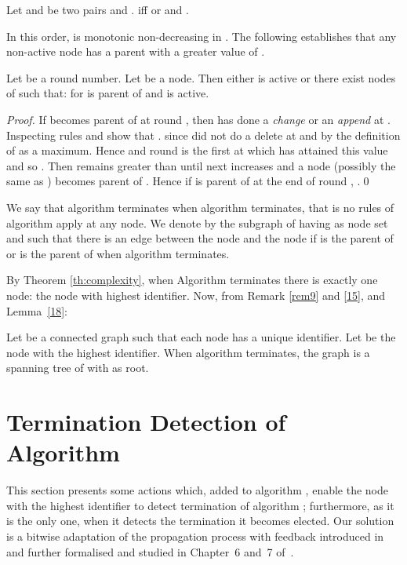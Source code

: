 \documentclass[11pt,envcountsame,letterpaper]{llncs}
\begin{document}
\begin{definition}
Let  and  be two pairs  and .
 iff  or  and .
\end{definition}
In this order,  is monotonic non-decreasing in .
The following establishes that any non-active node has a parent with a greater value of . 
\begin{lemma}\label{18}
Let  be a round number. Let 
 be a node. Then either  is active or there exist 
  nodes of 
such that: for   is parent of  and  
is active.
\end{lemma}
\begin{proof}
  If  becomes parent of  at round ,
  then  has done a {\it change} or an {\it append} at .
Inspecting rules  and  show that  .
 since  did not do a delete at  and  
by the definition of  as a maximum.
Hence  and round  is the first at which  has attained
this value
and so . Then  remains greater than  until  next
increases and a node  (possibly the same as ) becomes parent of .
Hence if  is parent of  at the end of round , .\qed
\end{proof}

\begin{definition}
We say that algorithm  terminates when algorithm  terminates,
that is no rules of algorithm  apply at any node.
We denote by  
the subgraph of  having  as node set and such that
there is an edge between the node  and the node  
if  is the parent of  or  is the parent of  when algorithm
 terminates.
\end{definition}

By Theorem \ref{th:complexity},
when Algorithm   terminates there is exactly one  node:
the node with highest identifier.
Now, from Remark \ref{rem9} and \ref{15}, and Lemma~\ref{18}:
\begin{proposition}\label{21}
Let  be a connected graph such that each node has a unique
identifier. Let  be the node with the highest identifier.
When algorithm  terminates,
the graph  is a spanning tree of  with  as root.
\end{proposition}

\section{Termination Detection of Algorithm }
\label{sec:STT}
This section presents some actions  which, added to algorithm
, enable  the node with the highest identifier to detect
termination of algorithm ; furthermore, as it is the only one,
when it detects the termination it becomes elected.
Our solution is a bitwise adaptation of the propagation process with feedback introduced in \cite{S} and further formalised and studied in Chapter~6 and~7
of~\cite{Tel}. 
\end{document}
